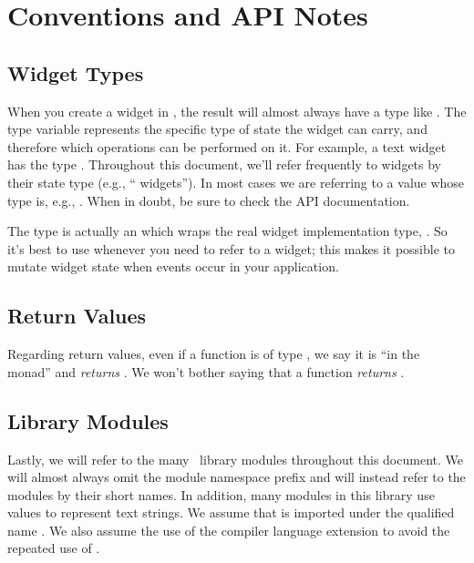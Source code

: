 \section{Conventions and API Notes}

\subsection{Widget Types}

When you create a widget in \vtyui, the result will almost always have
a type like .  The type variable  represents the
specific type of state the widget can carry, and therefore which
operations can be performed on it.  For example, a text widget has the
type .  Throughout this document, we'll refer
frequently to widgets by their state type (e.g., ``
widgets''). In most cases we are referring to a value whose type is,
e.g., .  When in doubt, be sure to check the API
documentation.

The  type is actually an  which wraps the real
widget implementation type, .  So it's best to use
 whenever you need to refer to a widget; this makes it
possible to mutate widget state when events occur in your application.

\subsection{Return Values}

Regarding return values, even if a function is of type , we say it is ``in the  monad'' and \textit{returns}
.  We won't bother saying that a function \textit{returns }.

\subsection{Library Modules}

Lastly, we will refer to the many \vtyui\ library modules throughout
this document.  We will almost always omit the
 module namespace prefix and will instead
refer to the modules by their short names.  In addition, many modules
in this library use  values to represent text strings.
We assume that  is imported under the qualified name
.  We also assume the use of the  compiler
language extension to avoid the repeated use of .
